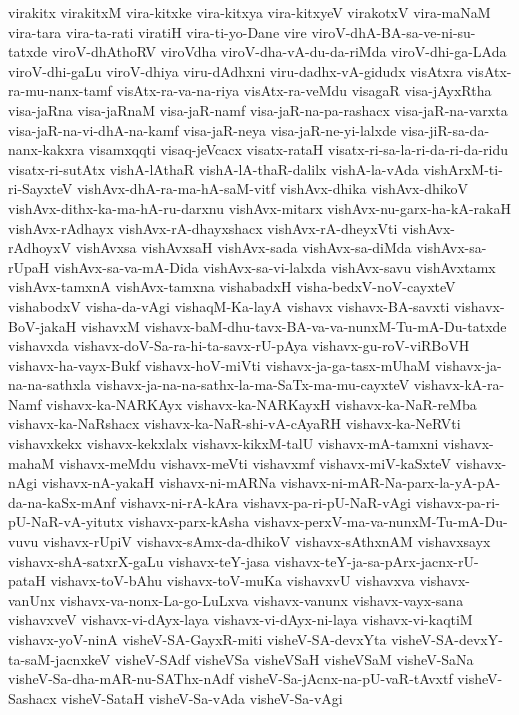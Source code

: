{virakitx
virakitxM
vira-kitxke
vira-kitxya
vira-kitxyeV
virakotxV
vira-maNaM
vira-tara
vira-ta-rati
viratiH
vira-ti-yo-Dane
vire
viroV-dhA-BA-sa-ve-ni-su-tatxde
viroV-dhAthoRV
viroVdha
viroV-dha-vA-du-da-riMda
viroV-dhi-ga-LAda
viroV-dhi-gaLu
viroV-dhiya
viru-dAdhxni
viru-dadhx-vA-gidudx
visAtxra
visAtx-ra-mu-nanx-tamf
visAtx-ra-va-na-riya
visAtx-ra-veMdu
visagaR
visa-jAyxRtha
visa-jaRna
visa-jaRnaM
visa-jaR-namf
visa-jaR-na-pa-rashacx
visa-jaR-na-varxta
visa-jaR-na-vi-dhA-na-kamf
visa-jaR-neya
visa-jaR-ne-yi-lalxde
visa-jiR-sa-da-nanx-kakxra
visamxqqti
visaq-jeVcacx
visatx-rataH
visatx-ri-sa-la-ri-da-ri-da-ridu
visatx-ri-sutAtx
vishA-lAthaR
vishA-lA-thaR-dalilx
vishA-la-vAda
vishArxM-ti-ri-SayxteV
vishAvx-dhA-ra-ma-hA-saM-vitf
vishAvx-dhika
vishAvx-dhikoV
vishAvx-dithx-ka-ma-hA-ru-darxnu
vishAvx-mitarx
vishAvx-nu-garx-ha-kA-rakaH
vishAvx-rAdhayx
vishAvx-rA-dhayxshacx
vishAvx-rA-dheyxVti
vishAvx-rAdhoyxV
vishAvxsa
vishAvxsaH
vishAvx-sada
vishAvx-sa-diMda
vishAvx-sa-rUpaH
vishAvx-sa-va-mA-Dida
vishAvx-sa-vi-lalxda
vishAvx-savu
vishAvxtamx
vishAvx-tamxnA
vishAvx-tamxna
vishabadxH
visha-bedxV-noV-cayxteV
vishabodxV
visha-da-vAgi
vishaqM-Ka-layA
vishavx
vishavx-BA-savxti
vishavx-BoV-jakaH
vishavxM
vishavx-baM-dhu-tavx-BA-va-va-nunxM-Tu-mA-Du-tatxde
vishavxda
vishavx-doV-Sa-ra-hi-ta-savx-rU-pAya
vishavx-gu-roV-viRBoVH
vishavx-ha-vayx-Bukf
vishavx-hoV-miVti
vishavx-ja-ga-tasx-mUhaM
vishavx-ja-na-na-sathxla
vishavx-ja-na-na-sathx-la-ma-SaTx-ma-mu-cayxteV
vishavx-kA-ra-Namf
vishavx-ka-NARKAyx
vishavx-ka-NARKayxH
vishavx-ka-NaR-reMba
vishavx-ka-NaRshacx
vishavx-ka-NaR-shi-vA-cAyaRH
vishavx-ka-NeRVti
vishavxkekx
vishavx-kekxlalx
vishavx-kikxM-talU
vishavx-mA-tamxni
vishavx-mahaM
vishavx-meMdu
vishavx-meVti
vishavxmf
vishavx-miV-kaSxteV
vishavx-nAgi
vishavx-nA-yakaH
vishavx-ni-mARNa
vishavx-ni-mAR-Na-parx-la-yA-pA-da-na-kaSx-mAnf
vishavx-ni-rA-kAra
vishavx-pa-ri-pU-NaR-vAgi
vishavx-pa-ri-pU-NaR-vA-yitutx
vishavx-parx-kAsha
vishavx-perxV-ma-va-nunxM-Tu-mA-Du-vuvu
vishavx-rUpiV
vishavx-sAmx-da-dhikoV
vishavx-sAthxnAM
vishavxsayx
vishavx-shA-satxrX-gaLu
vishavx-teY-jasa
vishavx-teY-ja-sa-pArx-jacnx-rU-pataH
vishavx-toV-bAhu
vishavx-toV-muKa
vishavxvU
vishavxva
vishavx-vanUnx
vishavx-va-nonx-La-go-LuLxva
vishavx-vanunx
vishavx-vayx-sana
vishavxveV
vishavx-vi-dAyx-laya
vishavx-vi-dAyx-ni-laya
vishavx-vi-kaqtiM
vishavx-yoV-ninA
visheV-SA-GayxR-miti
visheV-SA-devxYta
visheV-SA-devxY-ta-saM-jacnxkeV
visheV-SAdf
visheVSa
visheVSaH
visheVSaM
visheV-SaNa
visheV-Sa-dha-mAR-nu-SAThx-nAdf
visheV-Sa-jAcnx-na-pU-vaR-tAvxtf
visheV-Sashacx
visheV-SataH
visheV-Sa-vAda
visheV-Sa-vAgi
}
